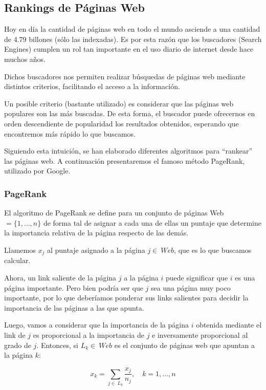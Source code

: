 \subsection{Rankings de Páginas Web}

Hoy en día la cantidad de páginas web en todo el mundo asciende a una cantidad de
4.79 billones (sólo las indexadas). Es por esta razón que los buscadores
(Search Engines) cumplen un rol tan importante en el uso diario de internet desde
hace muchos años.

Dichos buscadores nos permiten realizar búsquedas de páginas web mediante distintos
criterios, facilitando el acceso a la información.

Un posible criterio (bastante utilizado) es considerar que las páginas web populares
son las más buscadas. De esta forma, el buscador puede ofrecernos en orden descendiente
de popularidad los resultados obtenidos, esperando que encontremos más rápido lo
 que buscamos.

 Siguiendo esta intuición, se han elaborado diferentes algoritmos para ``rankear''
 las páginas web. A continuación presentaremos el famoso método PageRank, utilizado
 por Google.

\subsubsection{PageRank}\label{PageRank}

El algoritmo de PageRank\cite{Bryan2006} se define para un conjunto de
páginas Web $ = \{ 1,\dots, n \}$ de forma tal de asignar a cada una de ellas un
 puntaje que determine la importancia relativa de la página respecto de las demás.

Llamemos $x_j$ al puntaje asignado a la página $j\in\ Web$, que es lo que buscamos
calcular.

Ahora, un link saliente de la página $j$ a la página $i$ puede significar que $i$
 es una página importante. Pero bien podría ser que $j$ sea una página muy poco
 importante, por lo que deberíamos ponderar sus links salientes para decidir
 la importancia de las páginas a las que apunta.

Luego, vamos a considerar que la importancia de la página $i$ obtenida mediante el
link de $j$ es proporcional a la importancia de $j$ e inversamente proporcional
al grado de $j$. Entonces, si $L_k \in\ Web$ es el conjunto de páginas web que
apuntan a la página $k$:

\begin{equation} \label{eq:puntajes_page_rank}
    x_k = \sum\limits_{j \in\ L_k}{\frac{x_j}{n_j}},\quad k=1,\dots,n
\end{equation}

